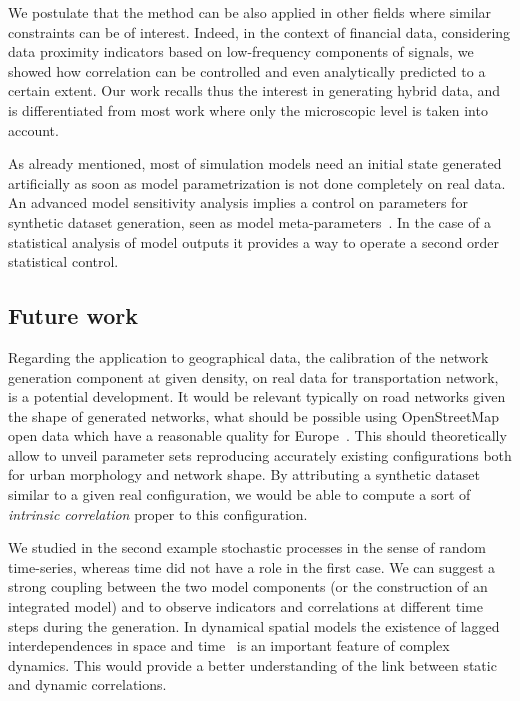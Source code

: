\documentclass{article}
\begin{document}
We postulate that the method can be also applied in other fields where similar constraints can be of interest. Indeed, in the context of financial data, considering data proximity indicators based on low-frequency components of signals, we showed how correlation can be controlled and even analytically predicted to a certain extent. Our work recalls thus the interest in generating hybrid data, and is differentiated from most work where only the microscopic level is taken into account.

As already mentioned, most of simulation models need an initial state generated artificially as soon as model parametrization is not done completely on real data. An advanced model sensitivity analysis implies a control on parameters for synthetic dataset generation, seen as model meta-parameters~\cite{raimbault2018space}. In the case of a statistical analysis of model outputs it provides a way to operate a second order statistical control.

\subsection*{Future work}


Regarding the application to geographical data, the calibration of the network generation component at given density, on real data for transportation network, is a potential development. It would be relevant typically on road networks given the shape of generated networks, what should be possible using OpenStreetMap open data which have a reasonable quality for Europe~\cite{girres2010quality}. This should theoretically allow to unveil parameter sets reproducing accurately existing configurations both for urban morphology and network shape. By attributing a synthetic dataset similar to a given real configuration, we would be able to compute a sort of \emph{intrinsic correlation} proper to this configuration.


We studied in the second example stochastic processes in the sense of random time-series, whereas time did not have a role in the first case. We can suggest a strong coupling between the two model components (or the construction of an integrated model) and to observe indicators and correlations at different time steps during the generation. In dynamical spatial models the existence of lagged interdependences in space and time~\cite{pigozzi1980interurban} is an important feature of complex dynamics. This would provide a better understanding of the link between static and dynamic correlations.
\end{document}
